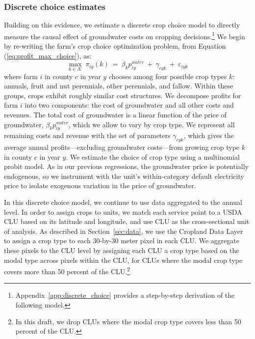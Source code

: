 \subsubsection{Discrete choice estimates}\label{sec:discrete_choice}
Building on this evidence, we estimate a discrete crop choice model to directly measure the causal effect of  groundwater costs on cropping decisions.\footnote{Appendix~\ref{app:discrete_choice} provides a step-by-step derivation of the following model.} We begin by re-writing the farm's crop choice optimization problem, from Equation (\ref{eq:profit_max_choice}), as:
\begin{equation}\label{eq:discrete_choice}
\max_{k \in \mathcal K} ~\pi_{iy}(k) ~=~ \beta_k p_{iy}^{water} ~+~ \gamma_{cyk} ~+~ \varepsilon_{iyk}
\end{equation}
where farm $i$ in county $c$ in year $y$ chooses among four possible crop types $k$: annuals, fruit and nut perennials, other perennials, and fallow.
Within these groups, crops exhibit roughly similar cost structures. We decompose profits for farm $i$ into two components: the cost of groundwater and all other costs and revenues. The total cost of groundwater is a linear function of the price of groundwater, $\beta_k p_{iy}^{water}$, which we allow to vary by crop type. We represent all remaining costs and revenue with the set of parameters $\gamma_{cyk}$, which gives the average annual profits---excluding groundwater costs---from growing crop type $k$ in county $c$ in year $y$. We estimate the choice of crop type using a multinomial probit model. As in our previous regressions, the groundwater price is potentially endogenous, so we instrument with the unit's within-category default electricity price to isolate exogenous variation in the price of groundwater.

In this discrete choice model, we continue to use data aggregated to the annual level. In order to assign crops to units, we match each service point to a USDA CLU based on its latitude and longitude, and use CLU as the cross-sectional unit of analysis. As described in Section~\ref{sec:data}, we use the Cropland Data Layer to assign a crop type to each 30-by-30 meter pixel in each CLU. We aggregate these pixels to the CLU level by assigning each CLU a crop type based on the modal type across pixels within  the CLU, for CLUs where the modal crop type covers more than 50 percent of the CLU.\footnote{In this draft, we drop CLUs where the modal crop type covers less than 50 percent of the CLU.}

